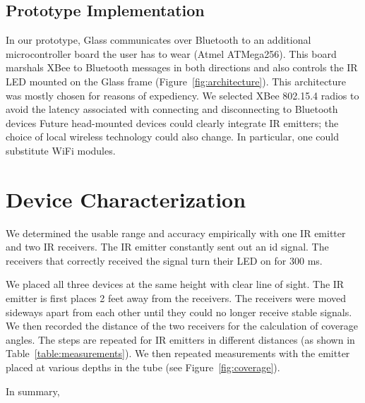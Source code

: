 \subsection{Prototype Implementation}
In our prototype, Glass communicates over Bluetooth to an additional microcontroller board the user has to wear (Atmel ATMega256). This board marshals XBee to Bluetooth messages in both directions and also controls the IR LED mounted on the Glass frame (Figure~\ref{fig:architecture}). This architecture was mostly chosen for reasons of expediency. We selected XBee 802.15.4 radios to avoid the latency associated with connecting and disconnecting to Bluetooth devices   Future head-mounted devices could clearly integrate IR emitters; the choice of local wireless technology could also change. In particular, one could substitute WiFi modules. 

\section{Device Characterization}
We determined the usable range and accuracy empirically with one IR emitter and two IR receivers. The IR emitter constantly sent out an id signal. The receivers that correctly received the signal turn their LED on for 300 ms.

We placed all three devices at the same height with clear line of sight. The IR emitter is first places 2 feet away from the receivers. The receivers were moved sideways apart from each other until they could no longer receive stable signals. We then recorded the distance of the two receivers for the calculation of coverage angles. The steps are repeated for IR emitters in different distances (as shown in Table~\ref{table:measurements}). We then repeated measurements with the emitter  placed at various depths in the tube (see Figure~\ref{fig:coverage}). 

In summary, 

